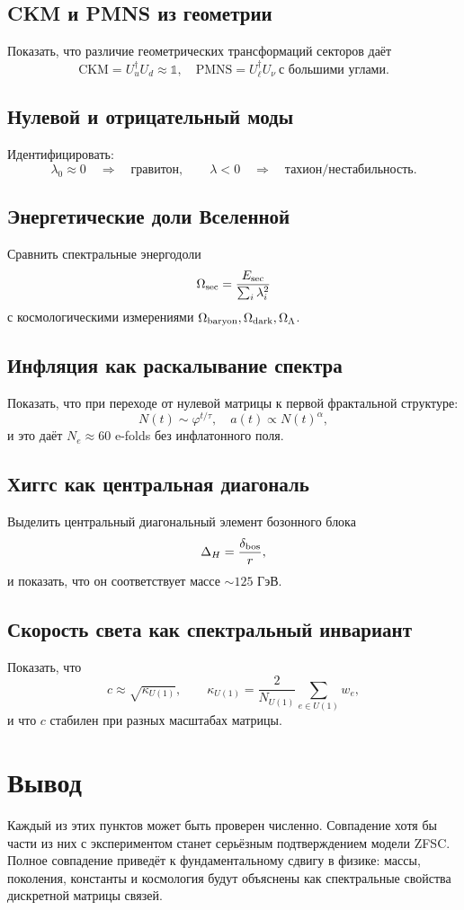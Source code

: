 \documentclass[12pt,a4paper]{article}
\begin{document}
\subsection{CKM и PMNS из геометрии}
Показать, что различие геометрических трансформаций секторов даёт
\[
\text{CKM} = U_u^\dagger U_d \approx \mathbb{1}, \quad
\text{PMNS} = U_\ell^\dagger U_\nu \ \text{с большими углами}.
\]

\subsection{Нулевой и отрицательный моды}
Идентифицировать:
\[
\lambda_0 \approx 0 \quad \Rightarrow \quad \text{гравитон}, \qquad
\lambda < 0 \quad \Rightarrow \quad \text{тахион/нестабильность}.
\]

\subsection{Энергетические доли Вселенной}
Сравнить спектральные энергодоли
\[
\Omega_{\rm sec} = \frac{E_{\rm sec}}{\sum_i \lambda_i^2}
\]
с космологическими измерениями $\Omega_{\rm baryon},\Omega_{\rm dark},\Omega_\Lambda$.

\subsection{Инфляция как раскалывание спектра}
Показать, что при переходе от нулевой матрицы к первой фрактальной структуре:
\[
N(t) \sim \varphi^{t/\tau}, \quad
a(t) \propto N(t)^\alpha,
\]
и это даёт $N_e \approx 60$ e-folds без инфлатонного поля.

\subsection{Хиггс как центральная диагональ}
Выделить центральный диагональный элемент бозонного блока
\[
\Delta_H = \frac{\delta_{\rm bos}}{r},
\]
и показать, что он соответствует массе $\sim 125$ ГэВ.

\subsection{Скорость света как спектральный инвариант}
Показать, что
\[
c \approx \sqrt{\kappa_{U(1)}}, \qquad 
\kappa_{U(1)} = \frac{2}{N_{U(1)}} \sum_{e\in U(1)} w_e,
\]
и что $c$ стабилен при разных масштабах матрицы.

\section{Вывод}
Каждый из этих пунктов может быть проверен численно. 
Совпадение хотя бы части из них с экспериментом станет серьёзным подтверждением модели ZFSC. 
Полное совпадение приведёт к фундаментальному сдвигу в физике: массы, поколения, константы и космология будут объяснены как спектральные свойства дискретной матрицы связей.
\end{document}
